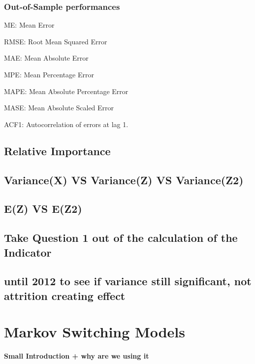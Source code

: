 \documentclass[12pt,a4paper,oneside]{book}
\begin{document}
\subsection{Out-of-Sample performances}


ME: Mean Error

RMSE: Root Mean Squared Error

MAE: Mean Absolute Error

MPE: Mean Percentage Error

MAPE: Mean Absolute Percentage Error

MASE: Mean Absolute Scaled Error

ACF1: Autocorrelation of errors at lag 1.

\section{Relative Importance}







\section{Variance(X) VS Variance(Z) VS Variance(Z2)}

\section{E(Z) VS E(Z2)}


\section{Take Question 1 out of the calculation of the Indicator}

\section{until 2012 to see if variance still significant, not attrition creating effect}



\chapter{Markov Switching Models}


\subsubsection{Small Introduction + why are we using it}
\end{document}
